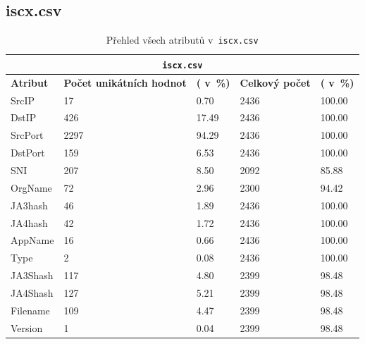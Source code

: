 \subsection{iscx.csv}
\begin{table}[H]
	\centering
	\begin{tabular}{lllll}
		\toprule
		\multicolumn{5}{c}{\texttt{iscx.csv}} \\
		\midrule
		\textbf{Atribut} & \textbf{Počet unikátních hodnot} & \textbf{( v~\%)} & \textbf{ Celkový počet} & \textbf{( v~\%)} \\
		\midrule
		SrcIP            & 17                                  & 0.70             & 2436                      & 100.00           \\
		DstIP            & 426                                 & 17.49            & 2436                      & 100.00           \\
		SrcPort          & 2297                                & 94.29            & 2436                      & 100.00           \\
		DstPort          & 159                                 & 6.53             & 2436                      & 100.00           \\
		SNI              & 207                                 & 8.50             & 2092                      & 85.88            \\
		OrgName          & 72                                  & 2.96             & 2300                      & 94.42            \\
		JA3hash          & 46                                  & 1.89             & 2436                      & 100.00           \\
		JA4hash          & 42                                  & 1.72             & 2436                      & 100.00           \\
		AppName          & 16                                  & 0.66             & 2436                      & 100.00           \\
		Type             & 2                                   & 0.08             & 2436                      & 100.00           \\
		JA3Shash         & 117                                 & 4.80             & 2399                      & 98.48            \\
		JA4Shash         & 127                                 & 5.21             & 2399                      & 98.48            \\
		Filename         & 109                                 & 4.47             & 2399                      & 98.48            \\
		Version          & 1                                   & 0.04             & 2399                      & 98.48            \\
		\bottomrule
	\end{tabular}
	\caption{Přehled všech atributů v~\texttt{iscx.csv}}
	\label{tab:iscx-appendix}
\end{table}
\newpage
